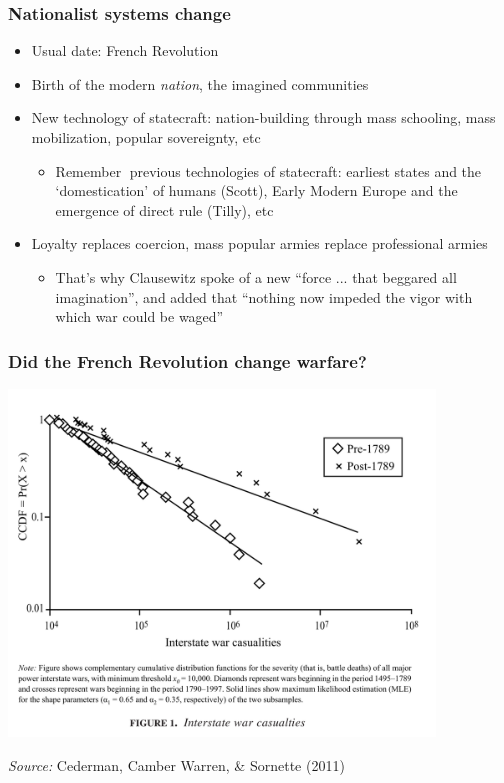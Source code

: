\documentclass[aspectratio=43]{beamer}
\begin{document}
\begin{frame}
\frametitle{Nationalist systems change}
\centering

\begin{itemize}[<+->]
  \item Usual date: French Revolution
  \item Birth of the modern \textit{nation}, the imagined communities
  \item New technology of statecraft: nation-building through mass schooling, mass mobilization, popular sovereignty, etc
  \begin{itemize}
    \item Remember previous technologies of statecraft: earliest states and the `domestication' of humans (Scott), Early Modern Europe and the emergence of direct rule (Tilly), etc
  \end{itemize}
  \item Loyalty replaces coercion, mass popular armies replace professional armies
  \begin{itemize}
    \item That's why Clausewitz spoke of a new ``force ... that beggared all imagination'', and added that ``nothing now impeded the vigor with which war could be waged''
  \end{itemize}
\end{itemize}

\end{frame}

\begin{frame}
\frametitle{Did the French Revolution change warfare?}
\centering

\includegraphics[width = 0.85\textwidth]{img/cederman_et_al_fig1}

{\scriptsize \textit{Source:} Cederman, Camber Warren, \& Sornette (2011)}

\end{frame}
\end{document}
